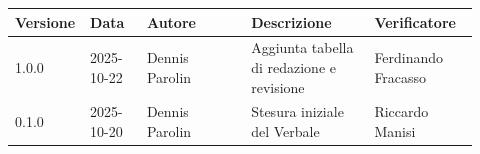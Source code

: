 \documentclass[a4paper,12pt]{article}
\begin{document}
\begin{center}
\small
\renewcommand{\arraystretch}{1.2} 
\begin{tabular}{|p{0.1\linewidth}|p{0.12\linewidth}|p{0.22\linewidth}|p{0.26\linewidth}|p{0.22\linewidth}|}
\hline
\rowcolor{gray!60} 
\textbf{Versione} & \textbf{Data} & \textbf{Autore} & \textbf{Descrizione} & \textbf{Verificatore} \\
\hline
\rowcolor{white}
1.0.0 & 2025-10-22 & Dennis Parolin & Aggiunta tabella di redazione e revisione & Ferdinando Fracasso \\
\hline
\rowcolor{gray!20}
0.1.0 & 2025-10-20 & Dennis Parolin & Stesura iniziale del Verbale & Riccardo Manisi \\
\hline
\end{tabular}
\end{center}
\end{document}
